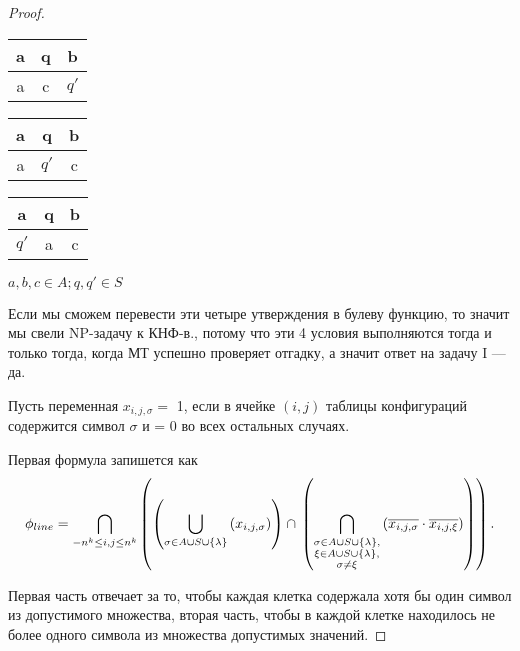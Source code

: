 \begin{proof}
\begin{enumerate}
\begin{table}[h!]
\centering
\begin{tabular}{|c|c|c|}
\hline a&q&b\\
\hline a&c&$q'$\\
\hline
\end{tabular}
\end{table}

\begin{table}[h!]
\centering
\begin{tabular}{|c|c|c|}
\hline a&q&b\\
\hline a&$q'$&c\\
\hline
\end{tabular}
\end{table}

\begin{table}[h!]
\centering
\begin{tabular}{|c|c|c|}
\hline a&q&b\\
\hline $q'$&a&c\\
\hline
\end{tabular}
\end{table}

$a, b, c \in A; q, q' \in S$

\end{enumerate}
Если мы сможем перевести эти четыре утверждения в булеву функцию, то значит мы
свели NP-задачу к КНФ-в., потому что эти 4 условия выполняются тогда и только
тогда, когда МТ успешно проверяет отгадку, а значит ответ на задачу I --- да.

Пусть переменная $x_{i,j,\sigma} =$ 1, если в ячейке  $(i,j)$ таблицы
конфигураций содержится символ  $\sigma$ и = 0 во всех остальных случаях.

Первая формула запишется как \[
	\phi_{line} = \bigcap\limits_{-n^k\le i, j\le n^k} \left( \left( \bigcup\limits_{\sigma \in A\cup S \cup
	\{\lambda \} } \left( x_{i,j,\sigma}  \right)  \right) \cap
	\\
	\left(
	\bigcap\limits_{\substack{\sigma\in A\cup S \cup
	\{\lambda \}
	, \\
\xi\in A\cup S \cup\{\lambda \},\\
\sigma \neq \xi
	}} \left( \overline{x_{i,j,\sigma}} \cdot \overline{x_{i,j,\xi}} \right)
\right) \right)
.\] 

Первая часть отвечает за то, чтобы каждая клетка содержала хотя бы один символ
из допустимого множества, вторая часть, чтобы в каждой клетке находилось не
более одного символа из множества допустимых значений.


\end{proof}

